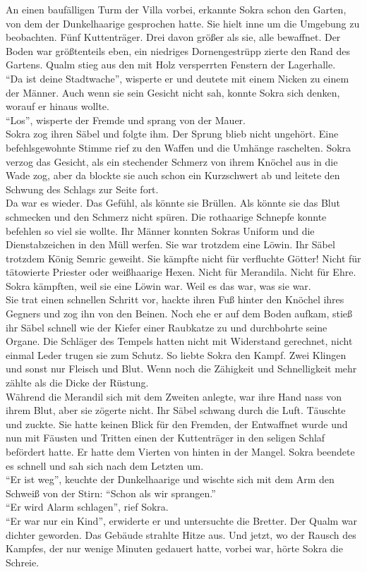 An einen baufälligen Turm der Villa vorbei, erkannte Sokra schon den Garten, von dem der 
Dunkelhaarige gesprochen hatte. Sie hielt inne um die Umgebung zu beobachten. Fünf Kuttenträger. 
Drei davon größer als sie, alle bewaffnet. Der Boden war größtenteils eben, ein niedriges 
Dornengestrüpp zierte den Rand des Gartens. Qualm stieg aus den mit Holz versperrten Fenstern der 
Lagerhalle.\\
``Da ist deine Stadtwache'', wisperte er und deutete mit einem Nicken zu einem der Männer. Auch 
wenn sie sein Gesicht nicht sah, konnte Sokra sich denken, worauf er hinaus wollte.\\
``Los'', wisperte der Fremde und sprang von der Mauer.\\
Sokra zog ihren Säbel und folgte ihm. Der Sprung blieb nicht ungehört. Eine befehlsgewohnte Stimme 
rief zu den Waffen und die Umhänge raschelten. Sokra verzog das Gesicht, als ein stechender Schmerz 
von ihrem Knöchel aus in die Wade zog, aber da blockte sie auch schon ein Kurzschwert ab und 
leitete den Schwung des Schlags zur Seite fort.\\
Da war es wieder. Das Gefühl, als könnte sie Brüllen. Als könnte sie das Blut schmecken und den 
Schmerz nicht spüren. Die rothaarige Schnepfe konnte befehlen so viel sie wollte. Ihr Männer 
konnten Sokras Uniform und die Dienstabzeichen in den Müll werfen. Sie war trotzdem eine Löwin. Ihr 
Säbel trotzdem König Semric geweiht. Sie kämpfte nicht für verfluchte Götter! Nicht für 
tätowierte Priester oder weißhaarige Hexen. Nicht für Merandila. Nicht für Ehre. Sokra kämpften, 
weil sie eine Löwin war. Weil es das war, was sie war.\\
Sie trat einen schnellen Schritt vor, hackte ihren Fuß hinter den Knöchel ihres Gegners und zog ihn 
von den Beinen. Noch ehe er auf dem Boden aufkam, stieß ihr Säbel schnell wie der Kiefer einer 
Raubkatze zu und durchbohrte seine Organe. Die Schläger des Tempels hatten nicht mit Widerstand 
gerechnet, nicht einmal Leder trugen sie zum Schutz. So liebte Sokra den Kampf. Zwei Klingen und 
sonst nur Fleisch und Blut. Wenn noch die Zähigkeit und Schnelligkeit mehr zählte als die Dicke 
der Rüstung.\\
Während die Merandil sich mit dem Zweiten anlegte, war ihre Hand nass von ihrem Blut, aber 
sie zögerte nicht. Ihr Säbel schwang durch die Luft. Täuschte und zuckte. Sie hatte keinen Blick 
für den Fremden, der Entwaffnet wurde und nun mit Fäusten und Tritten einen der Kuttenträger in den 
seligen Schlaf befördert hatte. Er hatte dem Vierten von hinten in der Mangel. Sokra beendete es 
schnell und sah sich nach dem Letzten um.\\
``Er ist weg'', keuchte der Dunkelhaarige und wischte sich mit dem Arm den Schweiß von der Stirn: 
``Schon als wir sprangen.''\\
``Er wird Alarm schlagen'', rief Sokra.\\
``Er war nur ein Kind'', erwiderte er und untersuchte die Bretter. Der Qualm war dichter geworden. 
Das Gebäude strahlte Hitze aus. Und jetzt, wo der Rausch des Kampfes, der nur wenige Minuten 
gedauert hatte, vorbei war, hörte Sokra die Schreie.\\

